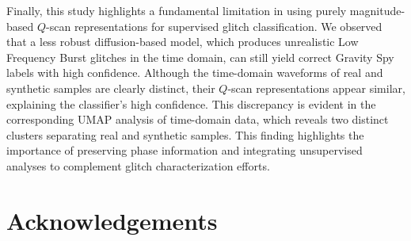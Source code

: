 \documentclass[reprint,nofootinbib,amsmath,amssymb,aps,floatfix]{revtex4-2}
\begin{document}
Finally, this study highlights a fundamental limitation in using purely magnitude-based $Q$-scan representations for supervised glitch classification.
We observed that a less robust diffusion-based model, which produces unrealistic Low Frequency Burst glitches in the time domain, can still yield correct Gravity Spy labels with high confidence.
Although the time-domain waveforms of real and synthetic samples are clearly distinct, their $Q$-scan representations appear similar, explaining the classifier’s high confidence.
This discrepancy is evident in the corresponding UMAP analysis of time-domain data, which reveals two distinct clusters separating real and synthetic samples.
This finding highlights the importance of preserving phase information and integrating unsupervised analyses to complement glitch characterization efforts.


\section*{Acknowledgements}

\end{document}
